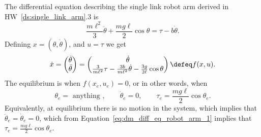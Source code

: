 
The differential equation describing the single link robot arm derived in HW~\ref{ds:single_link_arm}.3 is
\begin{equation}\label{eq:dm_diff_eq_robot_arm_1}
\frac{m\ell^2}{3}\ddot{\theta} + \frac{mg\ell}{2}\cos\theta = \tau - b\dot{\theta}.
\end{equation}
Defining $x=(\theta, \dot{\theta})$, and $u=\tau$ we get
\begin{align*}
\dot{x} = \begin{pmatrix} \dot{\theta} \\ \ddot{\theta}\end{pmatrix} 
= \begin{pmatrix} \dot{\theta} \\ \frac{3}{m\ell^2}\tau - \frac{3b}{m\ell^2}\dot{\theta} - \frac{3g}{2\ell}\cos\theta \end{pmatrix} \defeq f(x,u).
\end{align*}
The equilibrium is when $f(x_e,u_e)=0$, or in other words, when
\begin{equation}\label{dm:arm_equilibrium}
\theta_e = \text{~anything~}, \qquad \dot{\theta}_e =0, \qquad \tau_e = \frac{mg\ell}{2}\cos\theta_e.
\end{equation}
Equivalently, at equilibrium there is no motion in the system, which implies that $\ddot{\theta}_e = \dot{\theta}_e=0$, which from Equation~\eqref{eq:dm_diff_eq_robot_arm_1} implies that $\tau_e = \frac{mg\ell}{2}\cos\theta_e$.

